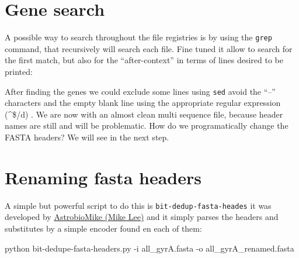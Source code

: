 \documentclass[
  letterpaper,
  DIV=11,
  numbers=noendperiod]{scrreprt}
\newenvironment{Shaded}{\begin{snugshade}}{\end{snugshade}}
\newcommand{\AttributeTok}[1]{\textcolor[rgb]{0.40,0.46,0.14}{#1}}
\newcommand{\DataTypeTok}[1]{\textcolor[rgb]{0.68,0.00,0.00}{#1}}
\newcommand{\ExtensionTok}[1]{\textcolor[rgb]{0.00,0.46,0.62}{#1}}
\newcommand{\FunctionTok}[1]{\textcolor[rgb]{0.28,0.35,0.67}{#1}}
\newcommand{\KeywordTok}[1]{\textcolor[rgb]{0.00,0.46,0.62}{#1}}
\newcommand{\NormalTok}[1]{\textcolor[rgb]{0.00,0.46,0.62}{#1}}
\newcommand{\PreprocessorTok}[1]{\textcolor[rgb]{0.68,0.00,0.00}{#1}}
\newcommand{\StringTok}[1]{\textcolor[rgb]{0.13,0.47,0.30}{#1}}
\begin{document}
\hypertarget{gene-search}{%
\section*{Gene search}\label{gene-search}}

A possible way to search throughout the file registries is by using the
\texttt{grep} command, that recursively will search each file. Fine
tuned it allow to search for the first match, but also for the
``after-context'' in terms of lines desired to be printed:

\begin{Shaded}
\end{Shaded}

After finding the genes we could exclude some lines using \texttt{sed}
avoid the ``--'' characters and the empty blank line using the
appropriate regular expression (\^{}\$/d) . We are now with an almost
clean multi sequence file, because header names are still and will be
problematic. How do we programatically change the FASTA headers? We will
see in the next step.

\hypertarget{renaming-fasta-headers}{%
\section*{Renaming fasta headers}\label{renaming-fasta-headers}}

A simple but powerful script to do this is
\texttt{bit-dedup-fasta-heades} it was developed by
\href{https://github.com/AstrobioMike}{AstrobioMike (Mike Lee)} and it
simply parses the headers and substitutes by a simple encoder found en
each of them:

\begin{Shaded}
\begin{Highlighting}[]
\ExtensionTok{python}\NormalTok{ bit{-}dedupe{-}fasta{-}headers.py }\AttributeTok{{-}i}\NormalTok{ all\_gyrA.fasta }\AttributeTok{{-}o}\NormalTok{ all\_gyrA\_renamed.fasta}
\end{Highlighting}
\end{Shaded}
\end{document}

